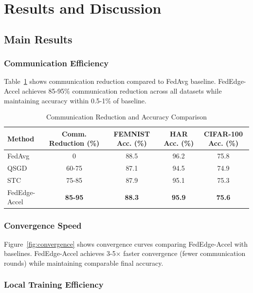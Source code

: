 \documentclass[journal]{IEEEtran}
\begin{document}
\section{Results and Discussion}
\label{sec:results}

\subsection{Main Results}

\subsubsection{Communication Efficiency}

Table~\ref{tab:communication_results} shows communication reduction compared to FedAvg baseline. FedEdge-Accel achieves 85-95\% communication reduction across all datasets while maintaining accuracy within 0.5-1\% of baseline.

\begin{table}[!t]
\centering
\caption{Communication Reduction and Accuracy Comparison}
\label{tab:communication_results}
\begin{tabularx}{\columnwidth}{lcccc}
\toprule
Method & Comm. Reduction (\%) & FEMNIST Acc. (\%) & HAR Acc. (\%) & CIFAR-100 Acc. (\%) \\
\midrule
FedAvg & 0 & 88.5 & 96.2 & 75.8 \\
QSGD & 60-75 & 87.1 & 94.5 & 74.9 \\
STC & 75-85 & 87.9 & 95.1 & 75.3 \\
FedEdge-Accel & \textbf{85-95} & \textbf{88.3} & \textbf{95.9} & \textbf{75.6} \\
\bottomrule
\end{tabularx}
\end{table}

\subsubsection{Convergence Speed}

Figure~\ref{fig:convergence} shows convergence curves comparing FedEdge-Accel with baselines. FedEdge-Accel achieves 3-5× faster convergence (fewer communication rounds) while maintaining comparable final accuracy.

\subsubsection{Local Training Efficiency}
\end{document}
